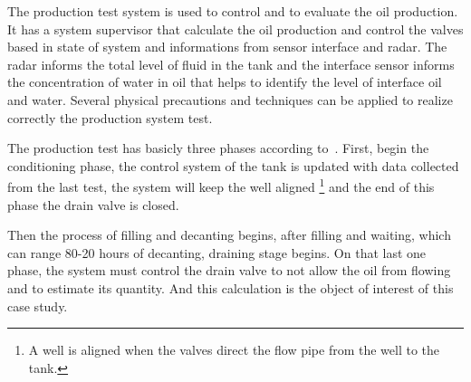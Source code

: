 \documentclass[11pt]{article} %
\begin{document}

The production test system is used to control and to evaluate the oil production. It has a system supervisor that calculate 
the oil production and control the valves based in state of system and informations from sensor interface and radar. 
The radar informs the total level of fluid in the tank and the interface sensor informs the concentration of water in oil that helps
to identify the level of interface oil and water. Several physical precautions and techniques can be applied to realize correctly the
production system test. 





The production test has basicly three phases according to~\cite{LAUT_SERGIO}.
First, begin the conditioning phase, the control system of the tank is updated
with data collected from the last test, the system will keep the well aligned 
\footnote{A well is aligned when the valves direct the flow pipe from the well
to the tank.} and the end of this phase the drain valve is closed.

Then the process of filling and decanting begins, after filling and waiting,
which can range 80-20 hours of decanting, draining stage begins. On that last one phase, the
system must control the drain valve to not allow the oil from flowing and to
estimate its quantity. And this calculation is the object of interest of this
case study.
\end{document}
